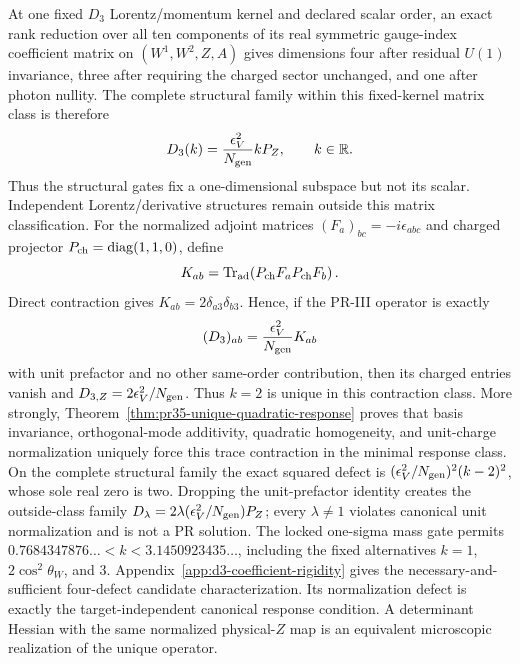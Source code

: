 At one fixed $D_3$ Lorentz/momentum kernel and declared scalar order, an exact rank reduction over all ten components of its real symmetric gauge-index coefficient matrix on $(W^1,W^2,Z,A)$ gives dimensions four after residual $U(1)$ invariance, three after requiring the charged sector unchanged, and one after photon nullity.  The complete structural family within this fixed-kernel matrix class is therefore
\begin{equation}
 D_3(k)=\frac{\epsilon_V^2}{N_{\rm gen}}kP_Z,
 \qquad k\in\mathbb R.
\end{equation}
Thus the structural gates fix a one-dimensional subspace but not its scalar. Independent Lorentz/derivative structures remain outside this matrix classification.  For the normalized
adjoint matrices $(F_a)_{bc}=-i\epsilon_{abc}$ and charged projector $P_{\rm ch}=\operatorname{diag}(1,1,0)$, define
\begin{equation}
 K_{ab}=\operatorname{Tr}_{\rm ad}
 \!\left(P_{\rm ch}F_aP_{\rm ch}F_b\right).
\end{equation}
Direct contraction gives $K_{ab}=2\delta_{a3}\delta_{b3}$.  Hence, if the PR-III operator is exactly
\begin{equation}
 (D_3)_{ab}=\frac{\epsilon_V^2}{N_{\rm gen}}K_{ab}
\end{equation}
with unit prefactor and no other same-order contribution, then its charged entries vanish and $D_{3,Z}=2\epsilon_V^2/N_{\rm gen}$.  Thus $k=2$ is unique in this contraction class.  More strongly,
Theorem~\ref{thm:pr35-unique-quadratic-response} proves that basis invariance, orthogonal-mode additivity, quadratic homogeneity, and unit-charge normalization uniquely force this trace contraction in the minimal response class.  On the complete structural family the exact
squared defect is
$(\epsilon_V^2/N_{\rm gen})^2(k-2)^2$, whose sole real zero is two.  Dropping the unit-prefactor identity creates the outside-class family $D_\lambda=2\lambda(\epsilon_V^2/N_{\rm gen})P_Z$; every $\lambda\ne1$ violates canonical unit normalization and is not a PR solution. The locked one-sigma mass gate permits $0.7684347876\ldots<k<3.1450923435\ldots$, including the fixed alternatives $k=1$, $2\cos^2\theta_W$, and $3$. Appendix~\ref{app:d3-coefficient-rigidity} gives the necessary-and-sufficient four-defect candidate characterization.  Its normalization defect is exactly the target-independent canonical response condition.  A determinant Hessian with the same normalized physical-$Z$ map is an equivalent microscopic realization of the unique operator.

